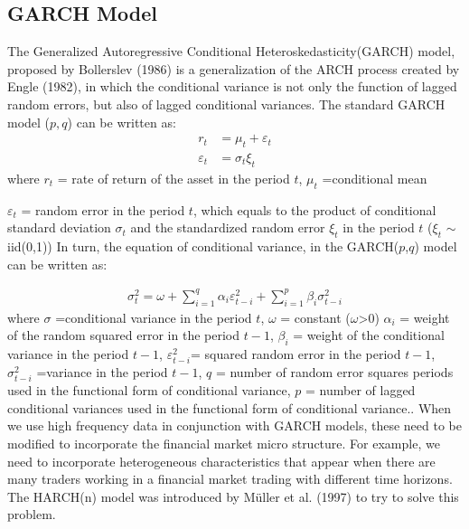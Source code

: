 \documentclass[a4paper,11pt,oneside]{book}
\begin{document}
\subsection{GARCH Model}
The Generalized Autoregressive Conditional Heteroskedasticity(GARCH) model, proposed by Bollerslev
(1986) is a generalization of the ARCH process created by
Engle (1982), in which the conditional variance is not only
the function of lagged random errors, but also of lagged
conditional variances. The standard GARCH model ($p,q$)
can be written as:
\begin{equation}
\begin{aligned}
r_t &= \mu_t + \varepsilon_t
\\
\varepsilon_t &= \sigma_t \xi_t 
\label{6}
\end{aligned}
\end{equation}
where $r_t$ = rate of return of the asset in the period $t$,\newline
$\mu_t$ =conditional mean \newline

$\varepsilon_t$ = random error in the period $t$, which equals to the
product of conditional standard deviation $\sigma_t$ and  the
standardized random error $\xi_t$ in the period $t$ ($\xi_t$ $\sim$ iid(0,1))
\newline\newline
In turn, the equation of conditional variance, in the GARCH($p$,$q$) model can be written as:


\begin{equation}
\begin{aligned}
\sigma^2_t = \omega + \sum_{i=1}^{q}\alpha_{i}\varepsilon^{2}_{t-i} + \sum_{i=1}^{p}\beta_{i} \sigma^2_{t-i}
\label{7}
\end{aligned}
\end{equation}
where $\sigma$ =conditional variance in the period $t$,\newline
$\omega$ = constant ($\omega$>0)\newline
$\alpha_{i}$ = weight of the random squared error in the period $t-1$,\newline
$\beta_{i}$ = weight of the conditional variance in the period $t-1$,\newline
$\varepsilon^{2}_{t-i}$= squared random error in the period $t-1$,\newline
$\sigma^2_{t-i}$ =variance in the period $t-1$,\newline
$q$ = number of random error squares periods used in the functional form of conditional variance,\newline
$p$ = number of lagged conditional variances used in the
functional form of conditional variance.\newline\newline. When we use high frequency data in conjunction with GARCH models, these need to be modified
to incorporate the financial market micro structure. For example, we need to incorporate heterogeneous
characteristics that appear when there are many traders working in a financial market trading with
different time horizons. The HARCH(n) model was introduced by Müller et al. (1997) to try to solve this problem.
\end{document}
